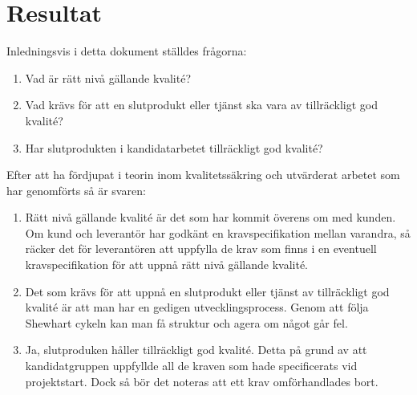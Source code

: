 \section{Resultat}
Inledningsvis i detta dokument ställdes frågorna:

\begin{enumerate}
  \item Vad är rätt nivå gällande kvalité?
  \item Vad krävs för att en slutprodukt eller tjänst ska vara av tillräckligt god kvalité?
  \item Har slutprodukten i kandidatarbetet tillräckligt god kvalité?
\end{enumerate}

\noindent Efter att ha fördjupat i teorin inom kvalitetssäkring och utvärderat arbetet som har genomförts så är svaren:

\begin{enumerate}
  \item Rätt nivå gällande kvalité är det som har kommit överens om med kunden. Om kund och leverantör har godkänt en kravspecifikation mellan varandra, så räcker det för leverantören att uppfylla de krav som finns i en eventuell kravspecifikation för att uppnå rätt nivå gällande kvalité.
  \item Det som krävs för att uppnå en slutprodukt eller tjänst av tillräckligt god kvalité är att man har en gedigen utvecklingsprocess. Genom att följa Shewhart cykeln kan man få struktur och agera om något går fel.  
  \item Ja, slutproduken håller tillräckligt god kvalité. Detta på grund av att kandidatgruppen uppfyllde all de kraven som hade specificerats vid projektstart. Dock så bör det noteras att ett krav omförhandlades bort.
\end{enumerate}